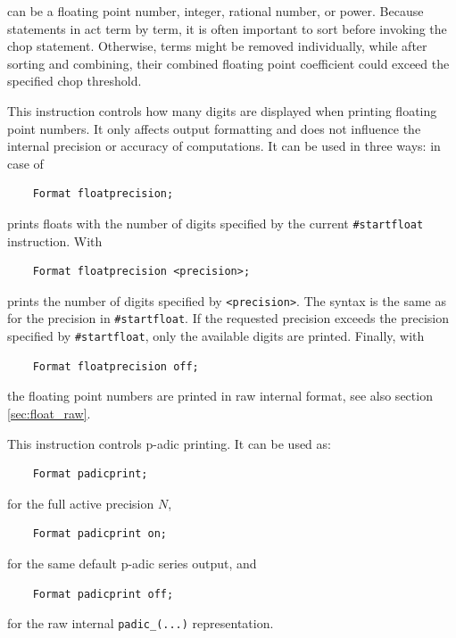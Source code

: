 \begin{description}
can be a floating point number, integer, rational number, or power. Because 
statements in \FORM{} act term by term, it is often important to sort before invoking the 
chop statement. Otherwise, terms might be removed individually, while after 
sorting and combining, their combined floating point coefficient could exceed 
the specified chop threshold. 
\item[Format floatprecision] This instruction controls how many digits are 
displayed when printing floating point numbers. It only affects output 
formatting and does not influence the internal precision or accuracy of 
computations. It can be used in three ways: in case of 
\begin{verbatim}
    Format floatprecision;
\end{verbatim}
\FORM{} prints floats with the number of digits specified by the current 
\texttt{\#startfloat} instruction. With
\begin{verbatim}
    Format floatprecision <precision>;
\end{verbatim}
\FORM{} prints the number of digits specified by \texttt{<precision>}. 
The syntax is the same as for the precision in \texttt{\#startfloat}. 
If the requested precision exceeds the precision specified by 
\texttt{\#startfloat}, only the available digits are printed. Finally, with 
\begin{verbatim}
    Format floatprecision off;
\end{verbatim}
the floating point numbers are printed in raw internal format, see also section \ref{sec:float_raw}. 
\item[Format padicprint] This instruction controls p-adic printing. It can
be used as:
\begin{verbatim}
    Format padicprint;
\end{verbatim}
for the full active precision $N$,
\begin{verbatim}
    Format padicprint on;
\end{verbatim}
for the same default p-adic series output, and
\begin{verbatim}
    Format padicprint off;
\end{verbatim}
for the raw internal \texttt{padic\_(...)} representation.
\end{description}

